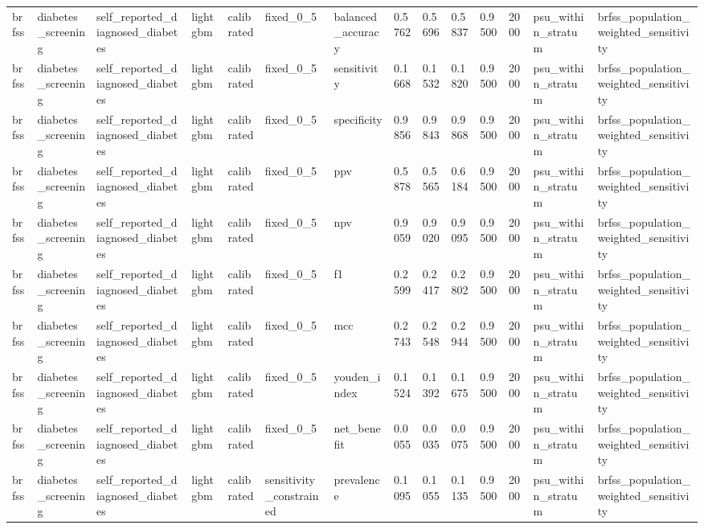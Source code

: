 \begin{tabular}{llllllllllllll}
brfss & diabetes\_screening & self\_reported\_diagnosed\_diabetes & lightgbm & calibrated & fixed\_0\_5 & balanced\_accuracy & 0.5762 & 0.5696 & 0.5837 & 0.9500 & 2000 & psu\_within\_stratum & brfss\_population\_weighted\_sensitivity \\
brfss & diabetes\_screening & self\_reported\_diagnosed\_diabetes & lightgbm & calibrated & fixed\_0\_5 & sensitivity & 0.1668 & 0.1532 & 0.1820 & 0.9500 & 2000 & psu\_within\_stratum & brfss\_population\_weighted\_sensitivity \\
brfss & diabetes\_screening & self\_reported\_diagnosed\_diabetes & lightgbm & calibrated & fixed\_0\_5 & specificity & 0.9856 & 0.9843 & 0.9868 & 0.9500 & 2000 & psu\_within\_stratum & brfss\_population\_weighted\_sensitivity \\
brfss & diabetes\_screening & self\_reported\_diagnosed\_diabetes & lightgbm & calibrated & fixed\_0\_5 & ppv & 0.5878 & 0.5565 & 0.6184 & 0.9500 & 2000 & psu\_within\_stratum & brfss\_population\_weighted\_sensitivity \\
brfss & diabetes\_screening & self\_reported\_diagnosed\_diabetes & lightgbm & calibrated & fixed\_0\_5 & npv & 0.9059 & 0.9020 & 0.9095 & 0.9500 & 2000 & psu\_within\_stratum & brfss\_population\_weighted\_sensitivity \\
brfss & diabetes\_screening & self\_reported\_diagnosed\_diabetes & lightgbm & calibrated & fixed\_0\_5 & f1 & 0.2599 & 0.2417 & 0.2802 & 0.9500 & 2000 & psu\_within\_stratum & brfss\_population\_weighted\_sensitivity \\
brfss & diabetes\_screening & self\_reported\_diagnosed\_diabetes & lightgbm & calibrated & fixed\_0\_5 & mcc & 0.2743 & 0.2548 & 0.2944 & 0.9500 & 2000 & psu\_within\_stratum & brfss\_population\_weighted\_sensitivity \\
brfss & diabetes\_screening & self\_reported\_diagnosed\_diabetes & lightgbm & calibrated & fixed\_0\_5 & youden\_index & 0.1524 & 0.1392 & 0.1675 & 0.9500 & 2000 & psu\_within\_stratum & brfss\_population\_weighted\_sensitivity \\
brfss & diabetes\_screening & self\_reported\_diagnosed\_diabetes & lightgbm & calibrated & fixed\_0\_5 & net\_benefit & 0.0055 & 0.0035 & 0.0075 & 0.9500 & 2000 & psu\_within\_stratum & brfss\_population\_weighted\_sensitivity \\
brfss & diabetes\_screening & self\_reported\_diagnosed\_diabetes & lightgbm & calibrated & sensitivity\_constrained & prevalence & 0.1095 & 0.1055 & 0.1135 & 0.9500 & 2000 & psu\_within\_stratum & brfss\_population\_weighted\_sensitivity \\

\end{tabular}
